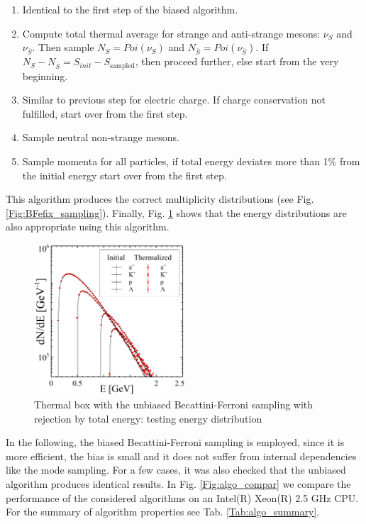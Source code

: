 \begin{enumerate}
  \item Identical to the first step of the biased algorithm.
  \item Compute total thermal average for strange and anti-strange mesons:
        $\nu_{S}$ and $\nu_{\bar{S}}$. Then sample $N_S = Poi(\nu_{S})$
        and $N_{\bar{S}} = Poi(\nu_{\bar{S}})$. If $N_S - N_{\bar{S}} = S_{init} -
        S_{\mathrm{sampled}}$, then proceed further, else start from the very
        beginning.
  \item Similar to previous step for electric charge. If charge conservation not
        fulfilled, start over from the first step.
  \item Sample neutral non-strange mesons.
  \item Sample momenta for all particles, if total energy deviates more than 1\% from
        the initial energy start over from the first step.
\end{enumerate}

This algorithm produces the correct multiplicity distributions (see Fig.
\ref{Fig:BFefix_sampling}). Finally, Fig. \ref{Fig:BFefix_sampling_energy}
shows that the energy distributions are also appropriate using this algorithm.

\begin{figure}
  \centering
  \includegraphics[width=0.5\textwidth]{plots/forced_thermalization/E_spectra_box_test.pdf}
  \caption{Thermal box with the unbiased Becattini-Ferroni sampling with
           rejection by total energy: testing energy distribution}
  \label{Fig:BFefix_sampling_energy}
\end{figure}

In the following, the biased Becattini-Ferroni sampling is employed, since it
is more efficient, the bias is small and it does not suffer from internal
dependencies like the mode sampling. For a few cases, it was also checked that the
unbiased algorithm produces identical results. In Fig. \ref{Fig:algo_compar} we
compare the performance of the considered algorithms on an Intel(R) Xeon(R) 2.5
GHz CPU. For the summary of algorithm properties see Tab.
\ref{Tab:algo_summary}.

